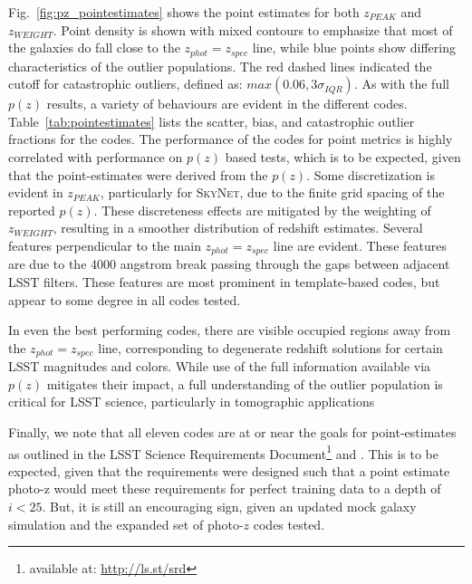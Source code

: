 
Fig.~\ref{fig:pz_pointestimates}  shows the point estimates for both $z_{PEAK}$ and $z_{WEIGHT}$.  Point density is shown with mixed contours to emphasize that most of the galaxies do fall close to the $z_{phot}=z_{spec}$ line, while blue points show differing characteristics of the outlier populations.  The red dashed lines indicated the cutoff for catastrophic outliers, defined as: $max(0.06,3\sigma_{IQR})$.  As with the full $p(z)$ results, a variety of behaviours are evident in the different codes.  Table~\ref{tab:pointestimates} lists the scatter, bias, and catastrophic outlier fractions for the codes.  The performance of the codes for point metrics is highly correlated with performance on $p(z)$ based tests, which is to be expected, given that the point-estimates were derived from the $p(z)$.  Some discretization is evident in $z_{PEAK}$, particularly for \textsc{SkyNet}, due to the finite grid spacing of the reported $p(z)$.  These discreteness effects are mitigated by the weighting of $z_{WEIGHT}$, resulting in a smoother distribution of redshift estimates.  Several features perpendicular to the main $z_{phot}=z_{spec}$ line are evident.  These features are due to the 4000 angstrom break passing through the gaps between adjacent LSST filters.  These features are most prominent in template-based codes, but appear to some degree in all codes tested.

In even the best performing codes, there are visible occupied regions away from the $z_{phot}=z_{spec}$ line, corresponding to degenerate redshift solutions for certain LSST magnitudes and colors.  While use of the full information available via $p(z)$ mitigates their impact, a full understanding of the outlier population is critical for LSST science, particularly in tomographic applications %

Finally, we note that all eleven codes are at or near the goals for point-estimates as outlined in the LSST Science Requirements Document\footnote{available at: \url{http://ls.st/srd}} and \citet{Graham:17}.  This is to be expected, given that the requirements were designed such that a point estimate photo-z would meet these requirements for perfect training data to a depth of $i<25$.  But, it is still an encouraging sign, given an updated mock galaxy simulation and the expanded set of photo-$z$ codes tested.

